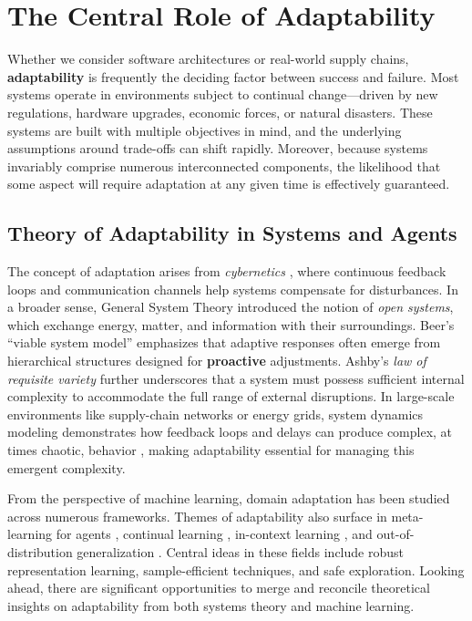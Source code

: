 \section{The Central Role of Adaptability}
Whether we consider software architectures or real-world supply chains, \textbf{adaptability} is frequently the deciding factor between success and failure. Most systems operate in environments subject to continual change—driven by new regulations, hardware upgrades, economic forces, or natural disasters. These systems are built with multiple objectives in mind, and the underlying assumptions around trade-offs can shift rapidly. Moreover, because systems invariably comprise numerous interconnected components, the likelihood that some aspect will require adaptation at any given time is effectively guaranteed.

\subsection{Theory of Adaptability in Systems and Agents}
The concept of adaptation arises from \textit{cybernetics} \cite{wiener1948}, where continuous feedback loops and communication channels help systems compensate for disturbances. In a broader sense, General System Theory \cite{bertalanffy1968} introduced the notion of \textit{open systems}, which exchange energy, matter, and information with their surroundings. Beer’s “viable system model” \cite{beer1959, beer1972} emphasizes that adaptive responses often emerge from hierarchical structures designed for \textbf{proactive} adjustments. Ashby’s \textit{law of requisite variety} \cite{ashby1956} further underscores that a system must possess sufficient internal complexity to accommodate the full range of external disruptions. In large-scale environments like supply-chain networks or energy grids, system dynamics modeling \cite{sterman2000} demonstrates how feedback loops and delays can produce complex, at times chaotic, behavior \cite{gleick1987}, making adaptability essential for managing this emergent complexity.

From the perspective of machine learning, domain adaptation \cite{redko2022domainadaptationtheory} has been studied across numerous frameworks. Themes of adaptability also surface in meta-learning for agents \cite{beck2024metareinforcementlearning}, continual learning \cite{wang2024continuallearning}, in-context learning \cite{dong2024incontextlearning}, and out-of-distribution generalization \cite{liu2023outofdistribution}. Central ideas in these fields include robust representation learning, sample-efficient techniques, and safe exploration. Looking ahead, there are significant opportunities to merge and reconcile theoretical insights on adaptability from both systems theory and machine learning.

